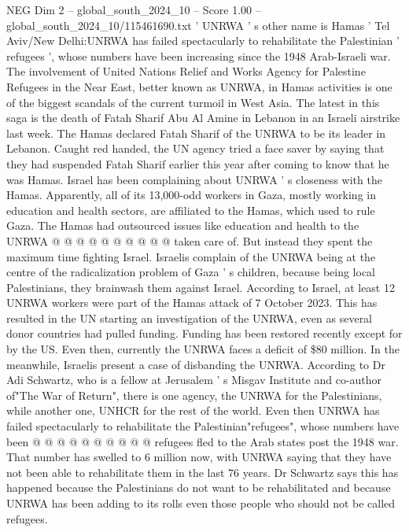 \begin{textsample}{NEG Dim 2 – global\_south\_2024\_10 – Score 1.00 – global\_south\_2024\_10/115461690.txt}  \label{ex:f2_neg_417}
' UNRWA ' s other name is Hamas ' Tel Aviv/New Delhi:UNRWA has failed spectacularly to rehabilitate the Palestinian ' refugees ', whose numbers have been increasing since the 1948 Arab-Israeli war.
The involvement of United Nations Relief and Works Agency for Palestine Refugees in the Near East, better known as UNRWA, in Hamas activities is one of the biggest scandals of the current turmoil in West Asia.
The latest in this saga is the death of Fatah Sharif Abu Al Amine in Lebanon in an Israeli airstrike last week.
The Hamas declared Fatah Sharif of the UNRWA to be its leader in Lebanon.
Caught red handed, the UN agency tried a face saver by saying that they had suspended Fatah Sharif earlier this year after coming to know that he was Hamas.
Israel has been complaining about UNRWA ' s closeness with the Hamas.
Apparently, all of its 13,000-odd workers in Gaza, mostly working in education and health sectors, are affiliated to the Hamas, which used to rule Gaza.
The Hamas had outsourced issues like education and health to the UNRWA @ @ @ @ @ @ @ @ @ @ taken care of.
But instead they spent the maximum time fighting Israel.
Israelis complain of the UNRWA being at the centre of the radicalization problem of Gaza ' s children, because being local Palestinians, they brainwash them against Israel.
According to Israel, at least 12 UNRWA workers were part of the Hamas attack of 7 October 2023.
This has resulted in the UN starting an investigation of the UNRWA, even as several donor countries had pulled funding.
Funding has been restored recently except for by the US.
Even then, currently the UNRWA faces a deficit of \$80 million.
In the meanwhile, Israelis present a case of disbanding the UNRWA.
According to Dr Adi Schwartz, who is a fellow at Jerusalem ' s Misgav Institute and co-author of"The War of Return", there is one agency, the UNRWA for the Palestinians, while another one, UNHCR for the rest of the world.
Even then UNRWA has failed spectacularly to rehabilitate the Palestinian"refugees", whose numbers have been @ @ @ @ @ @ @ @ @ @ refugees fled to the Arab states post the 1948 war.
That number has swelled to 6 million now, with UNRWA saying that they have not been able to rehabilitate them in the last 76 years.
Dr Schwartz says this has happened because the Palestinians do not want to be rehabilitated and because UNRWA has been adding to its rolls even those people who should not be called refugees.

\end{textsample}

